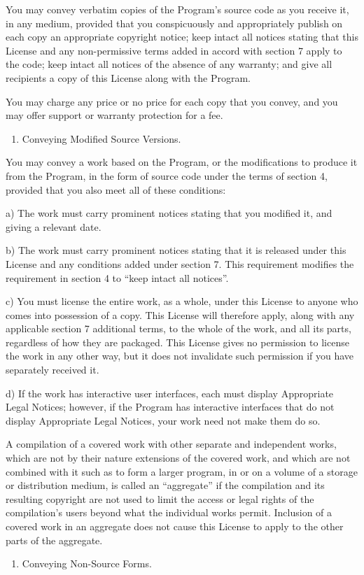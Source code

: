 \documentclass[letterpaper,10pt,english]{sphinxmanual}
\begin{document}
You may convey verbatim copies of the Program’s source code as you
receive it, in any medium, provided that you conspicuously and
appropriately publish on each copy an appropriate copyright notice;
keep intact all notices stating that this License and any
non-permissive terms added in accord with section 7 apply to the code;
keep intact all notices of the absence of any warranty; and give all
recipients a copy of this License along with the Program.

You may charge any price or no price for each copy that you convey,
and you may offer support or warranty protection for a fee.
\begin{enumerate}
%
\setcounter{enumi}{4}
\item {} 
Conveying Modified Source Versions.

\end{enumerate}

You may convey a work based on the Program, or the modifications to
produce it from the Program, in the form of source code under the
terms of section 4, provided that you also meet all of these conditions:

a) The work must carry prominent notices stating that you modified
it, and giving a relevant date.

b) The work must carry prominent notices stating that it is
released under this License and any conditions added under section
7.  This requirement modifies the requirement in section 4 to
“keep intact all notices”.

c) You must license the entire work, as a whole, under this
License to anyone who comes into possession of a copy.  This
License will therefore apply, along with any applicable section 7
additional terms, to the whole of the work, and all its parts,
regardless of how they are packaged.  This License gives no
permission to license the work in any other way, but it does not
invalidate such permission if you have separately received it.

d) If the work has interactive user interfaces, each must display
Appropriate Legal Notices; however, if the Program has interactive
interfaces that do not display Appropriate Legal Notices, your
work need not make them do so.

A compilation of a covered work with other separate and independent
works, which are not by their nature extensions of the covered work,
and which are not combined with it such as to form a larger program,
in or on a volume of a storage or distribution medium, is called an
“aggregate” if the compilation and its resulting copyright are not
used to limit the access or legal rights of the compilation’s users
beyond what the individual works permit.  Inclusion of a covered work
in an aggregate does not cause this License to apply to the other
parts of the aggregate.
\begin{enumerate}
%
\setcounter{enumi}{5}
\item {} 
Conveying Non-Source Forms.

\end{enumerate}
\end{document}
